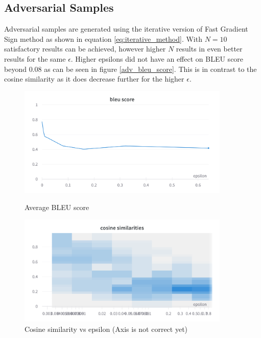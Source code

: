 \subsection*{Adversarial Samples}
Adversarial samples are generated using the iterative version of Fast Gradient Sign method as shown in equation \ref{eq:iterative_method}. With $N=10$ satisfactory results can be achieved, however higher $N$ results in even better results for the same $\epsilon$. Higher epsilons did not have an effect on BLEU score beyond $0.08$ as can be seen in figure \ref{adv_bleu_score}. This is in contrast to the cosine similarity as it does decrease further for the higher $\epsilon$.

\begin{figure}[h]
    \centering
    \begin{minipage}{0.45\textwidth}
        \centering
        \includegraphics[width=0.9\textwidth]{figures/adversarial_bleu_score_over_epsilon.png} %
        \caption{Average BLEU score}
        \label{adv_bleu_score}
    \end{minipage}\hfill
    \begin{minipage}{0.45\textwidth}
        \centering
        \includegraphics[width=0.9\textwidth]{figures/adversarial_cosine_similarity_heatmap.png} %
        \caption{Cosine similarity vs epsilon (Axis is not correct yet)}
        \label{adv_cosine_similarity}
    \end{minipage}
\end{figure}

